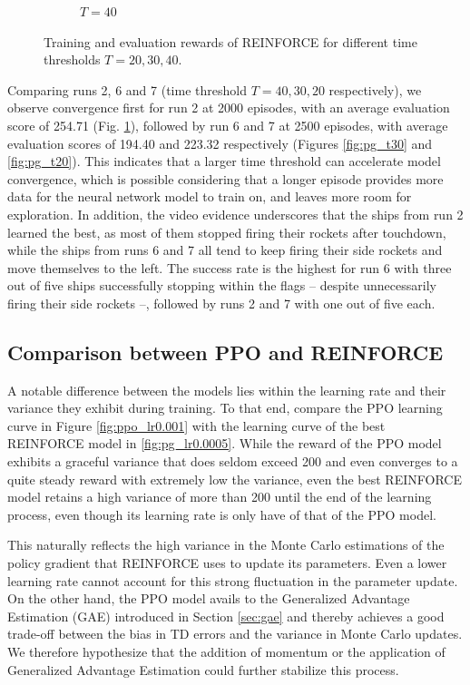 \documentclass[a4paper, 11pt]{article}
\begin{document}
\begin{figure}[ht]
\begin{center}
\begin{subfigure}{0.48\textwidth}
				\caption{$T=40$}
				\label{fig:pg_t40}
			\end{subfigure} 
		\end{center}
		\caption{Training and evaluation rewards of REINFORCE for different time thresholds $T=20,30,40$.}
		\label{fig:pg_t}
	\end{figure}
	
	Comparing runs 2, 6 and 7 (time threshold $T=40, 30, 20$ respectively), we observe convergence first for run 2 at 2000 episodes, with an average evaluation score of 254.71 (Fig. \ref{fig:pg_t40}), followed by run 6 and 7 at 2500 episodes, with average evaluation scores of 194.40 and 223.32 respectively (Figures \ref{fig:pg_t30} and \ref{fig:pg_t20}). 
	This indicates that a larger time threshold can accelerate model convergence, which is possible considering that a longer episode provides more data for the neural network model to train on, and leaves more room for exploration. 
	In addition, the video evidence underscores that the ships from run 2 learned the best, as most of them stopped firing their rockets after touchdown, while the ships from runs 6 and 7 all tend to keep firing their side rockets and move themselves to the left. 
	The success rate is the highest for run 6 with three out of five ships successfully stopping within the flags -- despite unnecessarily firing their side rockets --, followed by runs 2 and 7 with one out of five each.
	\subsection{Comparison between PPO and REINFORCE}
	A notable difference between the models lies within the learning rate and their variance they exhibit during training.
	To that end, compare the PPO learning curve in Figure \ref{fig:ppo_lr0.001} with the learning curve of the best REINFORCE model in \ref{fig:pg_lr0.0005}.
	While the reward of the PPO model exhibits a graceful variance that does seldom exceed 200 and even converges to a quite steady reward with extremely low the variance, even the best REINFORCE model retains a high variance of more than 200 until the end of the learning process, even though its learning rate is only have of that of the PPO model.
	
	This naturally reflects the high variance in the Monte Carlo estimations of the policy gradient that REINFORCE uses to update its parameters.
	Even a lower learning rate cannot account for this strong fluctuation in the parameter update. 
	On the other hand, the PPO model avails to the Generalized Advantage Estimation (GAE) introduced in Section \ref{sec:gae} and thereby achieves a good trade-off between the bias in TD errors and the variance in Monte Carlo updates.
	We therefore hypothesize that the addition of momentum or the application of Generalized Advantage Estimation could further stabilize this process.	
\end{document}
